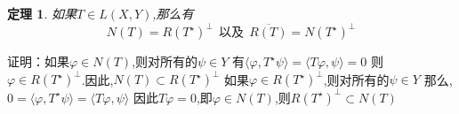 \documentclass[UTF8]{ctexart}
\numberwithin{equation}{section}
\newtheorem{theorem}{\hspace{2em}定理}[section]
\begin{document}
\begin{theorem}
如果$T\in L(X,Y)$,那么有
\begin{equation}
N(T)=R(T^{\star})^{\bot} \ \ \mbox{以及} \  \  \overline{R(T)}=N(T^{\star})^{\bot}
\end{equation}
\end{theorem}

证明：如果$\varphi \in N(T)$,则对所有的$\psi \in Y$
有$\langle \varphi ,T^{\star}\psi \rangle =\langle T\varphi ,\psi \rangle =0$
则$\varphi \in R(T^{\star})^{\bot}$.因此,$N(T)\subset R(T^{\star})^{\bot}$
如果$\varphi \in R(T^{\star})^{\bot}$,则对所有的$\psi \in Y$
那么,$0=\langle \varphi ,T^{\star}\psi \rangle =\langle T\varphi ,\psi \rangle$
因此$T\varphi =0$,即$\varphi \in N(T)$,则$R(T^{\star})^{\bot}\subset N(T)$
\end{document}
